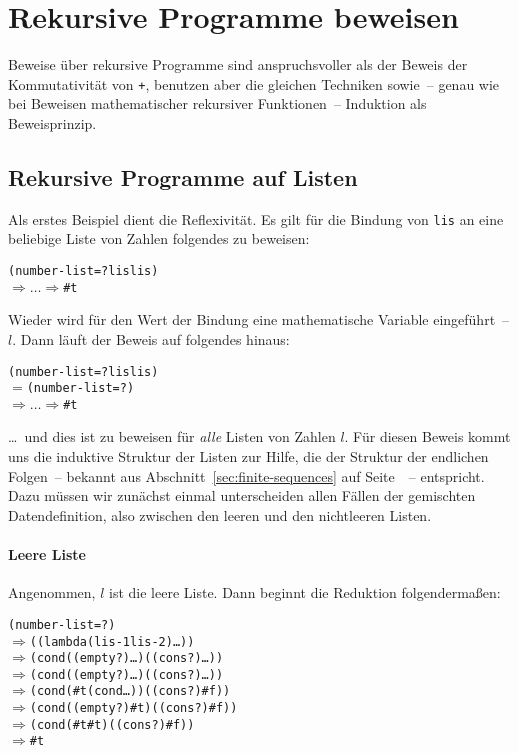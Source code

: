 \section{Rekursive Programme beweisen}
\label{sec:rek-scheme-beweisen}

Beweise über rekursive Programme sind anspruchsvoller als der
Beweis der Kommutativität von \texttt{+}, benutzen aber die gleichen
Techniken sowie~-- genau wie bei Beweisen mathematischer rekursiver
Funktionen~-- Induktion als Beweisprinzip. 

\subsection{Rekursive Programme auf Listen}

Als erstes Beispiel dient
die Reflexivität.  Es gilt für die Bindung von \texttt{lis} an eine
beliebige Liste von Zahlen folgendes zu beweisen:
%
\begin{alltt}
(number-list=? lis lis)
\(\Longrightarrow\ldots\Longrightarrow\) \#t
\end{alltt}
%
Wieder wird für den Wert der Bindung eine mathematische Variable
eingeführt~-- $l$.  Dann läuft der Beweis auf folgendes hinaus:
%
\begin{alltt}
(number-list=? lis lis)
\(=\) (number-list=?  )
\(\Longrightarrow\ldots\Longrightarrow\) \#t
\end{alltt}
%
\ldots~und dies ist zu beweisen für \emph{alle} Listen von Zahlen $l$.
Für diesen Beweis kommt uns die induktive Struktur der Listen zur
Hilfe, die der Struktur der endlichen Folgen~-- bekannt aus
Abschnitt~\ref{sec:finite-sequences} auf
Seite~\pageref{sec:finite-sequences}~-- entspricht.  Dazu müssen wir
zunächst einmal unterscheiden allen Fällen der gemischten
Datendefinition, also zwischen den leeren und den nichtleeren Listen.

\paragraph{Leere Liste}
Angenommen, $l$ ist die leere Liste.  Dann beginnt die Reduktion
folgendermaßen:
%
\begin{alltt}
(number-list=?  )
\(\Longrightarrow\) ((lambda (lis-1 lis-2) \ldots{})  )
\(\Longrightarrow\) (cond ((empty? ) \ldots) ((cons? ) \ldots))
\(\Longrightarrow\) (cond ((empty? ) \ldots) ((cons? ) \ldots))
\(\Longrightarrow\) (cond (#t (cond \ldots)) ((cons? ) #f))
\(\Longrightarrow\) (cond ((empty? ) #t) ((cons? ) #f))
\(\Longrightarrow\) (cond (#t #t) ((cons? ) #f))
\(\Longrightarrow\) #t
\end{alltt}
%

